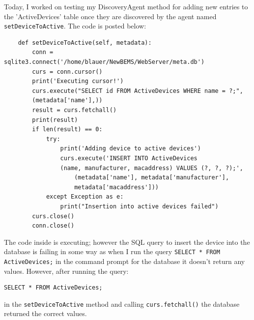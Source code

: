 \documentclass[fontsize=11pt, %
                             paper=letter, %
                             twoside, %
                             captions=tableheading,
                             index=totoc,
                             hyperref]{labbook}
\begin{document}
\begin{addmargin}[0cm]{0cm}
Today, I worked on testing my DiscoveryAgent method for adding new entries to the 'ActiveDevices' table once they are discovered by the agent named \texttt{setDeviceToActive}. The code is posted below:
\begin{Verbatim}
    def setDeviceToActive(self, metadata):
        conn = sqlite3.connect('/home/blauer/NewBEMS/WebServer/meta.db')
        curs = conn.cursor()
        print('Executing cursor!')
        curs.execute("SELECT id FROM ActiveDevices WHERE name = ?;", 
        (metadata['name'],))
        result = curs.fetchall()
        print(result)
        if len(result) == 0:
            try:
                print('Adding device to active devices')
                curs.execute('INSERT INTO ActiveDevices 
                (name, manufacturer, macaddress) VALUES (?, ?, ?);',
                    (metadata['name'], metadata['manufacturer'], 
                    metadata['macaddress']))
            except Exception as e:
                print("Insertion into active devices failed")
        curs.close()
        conn.close()
\end{Verbatim}
The code inside is executing; however the SQL query to insert the device into the database is failing in some way as when I run the query 
\texttt{SELECT * FROM ActiveDevices;} in the command prompt for the database it doesn't return any values. However, after running the query:
\begin{Verbatim}
SELECT * FROM ActiveDevices; 
\end{Verbatim}
in the \texttt{setDeviceToActive} method and calling \texttt{curs.fetchall()} the database returned the correct values.

\end{addmargin}








\end{document}

